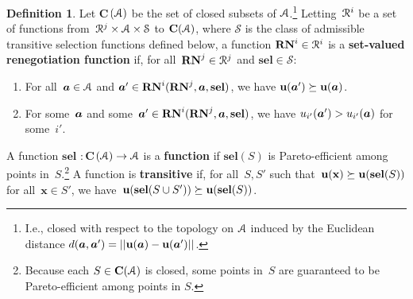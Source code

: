 \documentclass[sigconf]{aamas}
\newcommand{\selection}{sel}%
\newcommand{\renegb}{\mathbf{\selection}}
\theoremstyle{definition}
\newtheorem{definition}{Definition} %
\begin{document}
\begin{definition}
Let
${\mathbf{C}}$ $\hspace{-0.8mm} (\mathcal{A})$ be the set of
closed
subsets of $\mathcal{A}$.\footnote{I.e., closed with respect to the topology on $\mathcal{A}$
induced by the Euclidean distance $d(\boldsymbol{a},\boldsymbol{a}') = ||\textbf{u}(\boldsymbol{a}) - \textbf{u}(\boldsymbol{a}')||$.}
Letting~$\mathcal{R}^{i}$
be a set of functions
from~$\mathcal{R}^{j} \times \mathcal{A} \times \mathcal S$
to $\mathbf{C}(\mathcal{A})$, where $\mathcal S$ is the class of admissible
transitive selection functions defined below,
a function 
$\mathbf{RN}^{i} \in \mathcal{R}^{i}$
is a \textbf{set-valued renegotiation
function}
if, 
for all~$\mathbf{RN}^{j} \in \mathcal{R}^{j}$ and $\renegb\in\mathcal S$:
\begin{enumerate}
    \item 
    For all~$\boldsymbol{a} \in \mathcal{A}$ and
    $\fullact' \in \renegi(\renegj, \fullact,\renegb)$,
    we have
    $\textbf{u}(\boldsymbol{a}') \succeq \textbf{u}(\boldsymbol{a})$. 
    \item
     For some~$\boldsymbol{a}$
    and some~$\fullact' \in \renegi(\renegj, \fullact,\renegb)$,
    we have
    $u_{i'}(\boldsymbol{a}') > u_{i'}(\boldsymbol{a})$
    for some~$i'$.
\end{enumerate}

A function 
$\renegb$ $: {\mathbf{C}}$ $\hspace{-0.8mm} (\mathcal{A}) \to \mathcal{A}$
is a \textbf{\selfunction{} function}
if
$\renegb({S})$ is Pareto-efficient
among points in~${S}$.\footnote{Because each ${S} \in \mathbf{C}(\mathcal{A})$
is closed,
some points in~${S}$
are guaranteed to be Pareto-efficient among points in
${S}$.}
A \selfunction{} function is \textbf{transitive}
if, for all~${S}, {S'}$ such 
that~$\fullpay(\mathbf{x}) \succeq \fullpay(\renegb({S}))$
for all~$\textbf{x} \in {S'}$,
we have~$\fullpay(\renegb({S} \cup {S'})) \succeq \fullpay(\renegb({S}))$.
\end{definition}
\end{document}
